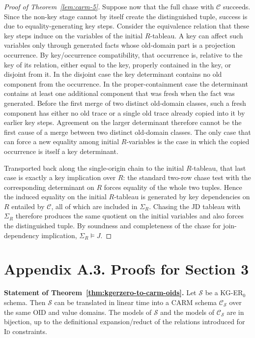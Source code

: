 \documentclass[10pt]{article}
\begin{document}
\begin{proof}[Proof of Theorem~\ref{lem:carm-5}]
Suppose now that the full chase with \(\mathcal C\) succeeds.  Since the
non-key stage cannot by itself create the distinguished tuple, success is
due to equality-generating key steps.  Consider the equivalence relation
that these key steps induce on the variables of the initial
\(R\)-tableau.  A key can affect such variables only through generated
facts whose old-domain part is a projection occurrence.  By
key/occurrence compatibility, that occurrence is, relative to the key of
its relation, either equal to the key, properly contained in the key, or
disjoint from it.  In the disjoint case the key determinant contains no
old component from the occurrence.  In the proper-containment case the
determinant contains at least one additional component that was fresh
when the fact was generated.  Before the first merge of two distinct
old-domain classes, such a fresh component has either no old trace or a
single old trace already copied into it by earlier key steps.  Agreement
on the larger determinant therefore cannot be the first cause of a merge
between two distinct old-domain classes.  The only case that can force a
new equality among initial \(R\)-variables is the case in which the
copied occurrence is itself a key determinant.

Transported back along the single-origin chain to the initial
\(R\)-tableau, that last case is exactly a key implication over \(R\):
the standard two-row chase test with the corresponding determinant on
\(R\) forces equality of the whole two tuples.  Hence the induced
equality on the initial \(R\)-tableau is generated by key dependencies on
\(R\) entailed by \(\mathcal C\), all of which are included in
\(\Sigma_R\).  Chasing the JD tableau with \(\Sigma_R\) therefore
produces the same quotient on the initial variables and also forces the
distinguished tuple.  By soundness and completeness of the chase for
join-dependency implication, \(\Sigma_R\models J\).
\end{proof}

\newpage
\section*{Appendix A.3. Proofs for Section 3}

\noindent\textbf{Statement of Theorem~\ref{thm:kgerzero-to-carm-oids}.}
Let $\mathcal S$ be a KG-ER$_0$ schema.  Then
$\mathcal S$ can be translated in linear time into a \textsf{CARM}
schema $\mathcal C_{\mathcal S}$ over the same OID and value domains.
The models of $\mathcal S$ and the models of $\mathcal C_{\mathcal S}$
are in bijection, up to the definitional expansion/reduct of the
relations introduced for \textsc{Id} constraints.
\end{document}
